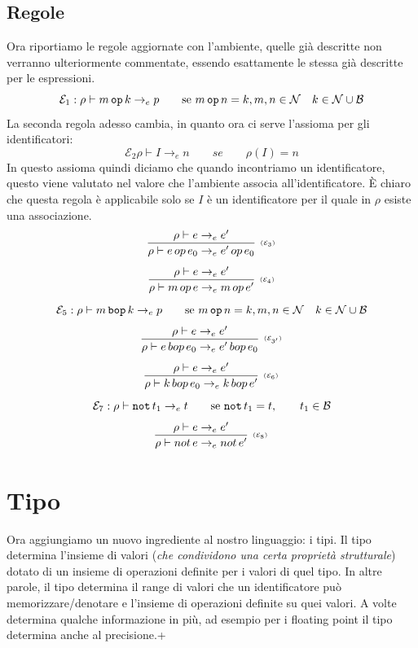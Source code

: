 \documentclass[oneside,a4paper,11pt]{book}
\theoremstyle{italicstyle}
\theoremstyle{normStyle}
\begin{document}
\subsection{Regole}
Ora riportiamo le regole aggiornate con l'ambiente, quelle già descritte non 
verranno ulteriormente commentate, essendo esattamente le stessa già descritte per le 
espressioni.
\[
  \mathcal{E}_1: \rho \vdash m\,\verb|op|\,k\rightarrow_e p \qquad \text{se }m\,\verb|op|\,n = k,m,n \in \mathcal{N}\quad k \in \mathcal{N}\cup\mathcal{B}
\]
La seconda regola adesso cambia, in quanto ora ci serve l'assioma per gli identificatori:
\[
  \mathcal{E}_2 \rho \vdash I \rightarrow_e n\qquad se \qquad\rho(I)= n
\]
In questo assioma quindi diciamo che quando incontriamo un identificatore,
questo viene valutato nel valore che l’ambiente associa all’identificatore.
È chiaro che questa regola è applicabile solo se $I$ è un identificatore per
il quale in $\rho$ esiste una associazione.
\[
    \infer[\scriptscriptstyle (\mathcal{E}_3)]
    {
      \rho \vdash e \, op \, e_0 \rightarrow_e e' \, op \, e_0
    }
    {
      \rho \vdash e \rightarrow_e e'
    }
\]
\[
    \infer[\scriptscriptstyle (\mathcal{E}_4)]
    {
      \rho \vdash m \, op \, e \rightarrow_e m \, op \, e'
    }
    {
      \rho \vdash e \rightarrow_e e'
    }
\]
\[
  \mathcal{E}_5: \rho \vdash m\,\verb|bop|\,k\rightarrow_e p \qquad \text{se }m\,\verb|op|\,n = k,m,n \in \mathcal{N}\quad k \in \mathcal{N}\cup\mathcal{B}
\]
\[
    \infer[\scriptscriptstyle (\mathcal{E}_{3'})]
    {
      \rho \vdash e \, bop \, e_0 \rightarrow_e e' \, bop \, e_0
    }
    {
      \rho \vdash e \rightarrow_e e'
    }
\]
\[
    \infer[\scriptscriptstyle (\mathcal{E}_{6})]
    {
      \rho \vdash k \, bop \, e_0 \rightarrow_e k \, bop \, e'
    }
    {
      \rho \vdash e \rightarrow_e e'
    }
\]
\[
  \mathcal{E}_7: \rho \vdash \verb|not| \,t_1\rightarrow_e t \qquad \text{se }\verb|not|\,t_1 = t, \qquad t_1\in \mathcal{B}
\]
\[
    \infer[\scriptscriptstyle (\mathcal{E}_{8})]
    {
      \rho \vdash not \, e \rightarrow_e not \, e'
    }
    {
      \rho \vdash e \rightarrow_e e'
    }
\]
\section{Tipo}
Ora aggiungiamo un nuovo ingrediente al nostro linguaggio: i tipi. Il tipo determina l'insieme 
di valori (\textit{che condividono una certa proprietà strutturale}) dotato di un insieme 
di operazioni definite per i valori di quel tipo. In altre parole, il tipo determina il range di valori che
un identificatore può memorizzare/denotare e l'insieme di operazioni definite su quei valori.
A volte determina qualche informazione in più, ad esempio per i floating point il tipo determina anche al precisione.+
\end{document}
